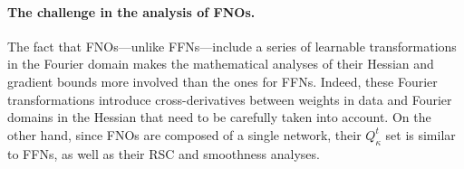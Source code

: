 \paragraph{\textbf{The challenge in the analysis of FNOs.}} 
The fact that FNOs---unlike FFNs---include a series of learnable transformations in the Fourier domain makes the mathematical analyses of their Hessian and gradient bounds more involved than the ones for FFNs. Indeed, these Fourier transformations 
introduce cross-derivatives between weights in data and Fourier domains in 
the Hessian that need to be carefully taken into account. On the other hand, since FNOs are composed of a single network, their $Q^t_{\kappa}$ set is similar to FFNs, as well as their RSC and smoothness analyses.
%
%


